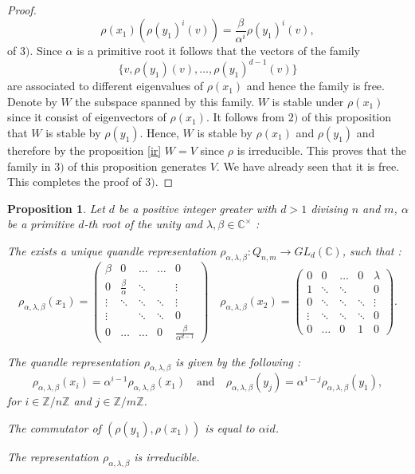 \documentclass[12pt, reqno]{amsart}
\newtheorem{proposition}[theorem]{Proposition}
\begin{document}
\begin{proof}
$$\rho(x_1)(\rho(y_1)^i(v))=\frac{\beta}{\alpha^i}\rho(y_1)^i(v),$$
of $3)$. Since $\alpha$ is a primitive root it follows that the vectors of the family $$\{v,\rho(y_1)(v),\dots,\rho(y_1)^{d-1}(v)\}$$ are associated to different eigenvalues of $\rho(x_1)$ and hence the family is free. Denote by $W$ the subspace spanned by this family. $W$ is stable under $\rho(x_1)$ since it consist of eigenvectors of $\rho(x_1)$. It follows from $2)$ of this proposition that $W$ is stable by $\rho(y_1)$. Hence, $W$ is stable by $\rho(x_1)$ and $\rho(y_1)$ and therefore by the proposition \ref{ir} $W=V$ since $\rho$ is irreducible. This proves that the family in $3)$ of this proposition generates $V$. We have already seen that it is free. This completes the proof of $3)$.
\end{proof}
\begin{proposition}
Let $d$ be a positive integer greater with $d>1$ divising $n$ and $m$, $\alpha$ be a primitive $d$-th root of the unity and $\lambda, \beta \in \mathbb{C}^\times$ :
\item[1)] The exists a unique quandle representation $\rho_{\alpha,\lambda,\beta} : Q_{n,m} \to GL_d(\mathbb{C})$, such that :
 $$\rho_{\alpha,\lambda,\beta}(x_1)=\begin{pmatrix}
    \beta & 0   & \dots& \dots &  0 \\
     0 &\frac{\beta}{\alpha}   & \ddots&  &\vdots \\
    \vdots & \ddots &  \ddots & \ddots &\vdots \\
\vdots &   & \ddots  &\ddots &0\\
   0 &   \dots & \dots  & 0&\frac{\beta}{\alpha^{d-1}}
\end{pmatrix} \quad   \rho_{\alpha,\lambda,\beta}(x_2)=\begin{pmatrix}
   0 & 0   & \dots& 0 &  \lambda \\
     1 & \ddots   & \ddots&  &0\\
    0 & \ddots &  \ddots & \ddots &\vdots \\
\vdots &  \ddots & \ddots  &\ddots &0\\
   0 &   \dots & 0 & 1&0
\end{pmatrix}.$$
\item[2)] The quandle representation $\rho_{\alpha,\lambda,\beta}$ is given by the following : 
$$\rho _{\alpha,\lambda,\beta}(x_i)=\alpha^{i-1}\rho_{\alpha,\lambda,\beta}(x_1) \quad \text{and} \quad \rho_{\alpha,\lambda,\beta}(y_j)=\alpha^{1-j}\rho_{\alpha,\lambda,\beta}(y_1),$$
for $i\in \mathbb{Z}/n\mathbb{Z}$ and $j\in \mathbb{Z}/m\mathbb{Z}$.
\item[3)] The commutator of $(\rho(y_1),\rho(x_1))$ is equal to $\alpha id$.
\item[4)] The representation $\rho_{\alpha,\lambda,\beta}$ is irreducible.
\end{proposition}
\end{document}
